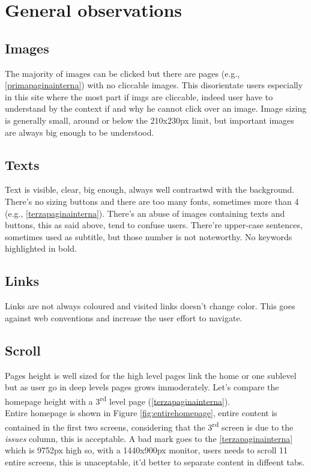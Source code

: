 \documentclass[
10pt, %
a4paper, %
oneside, %
headinclude,footinclude, %
BCOR5mm, %
]{scrartcl}
\begin{document}

\newpage
\section{General observations}

	\subsection{Images}
	The majority of images can be clicked but there are pages (e.g., \ref{primapaginainterna}) with no cliccable images. This disorientate users especially in this site where the most part if imgs are cliccable, indeed user have to understand by the context if and why he cannot click over an image.
	Image sizing is generally small, around or below the 210x230px limit, but important images are always big enough to be understood.

	\subsection{Texts}
	Text is visible, clear, big enough, always well contrastwd with the background. There's no sizing buttons and there are too many fonts, sometimes more than 4 (e.g., \ref{terzapaginainterna}).
	There's an abuse of images containing texts and buttons, this as said above, tend to confuse users. 
	There're upper-case sentences, sometimes used as subtitle, but those number is not noteworthy. No keywords highlighted in bold.


	\subsection{Links}
	Links are not always coloured and visited links doesn't change color. This goes against web conventions and increase the user effort to navigate. 

	\subsection{Scroll}
	Pages height is well sized for the high level pages link the home or one sublevel but as user go in deep levels pages grows immoderately. Let's compare the homepage height with a 3\textsuperscript{rd} level page (\ref{terzapaginainterna}). \\
	Entire homepage is shown in Figure \ref{fig:entirehomepage}, entire content is contained in the first two screens, considering that the 3\textsuperscript{rd} screen is due to the \emph{issues} column, this is acceptable.
	A bad mark goes to the \ref{terzapaginainterna} which is 9752px high so, with a 1440x900px monitor, users needs to scroll 11 entire screens, this is unaceptable, it'd better to separate content in diffeent tabs. 
\end{document}
